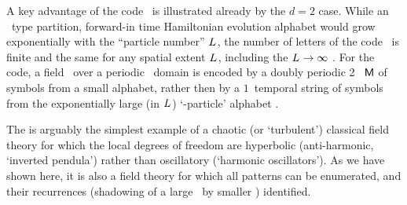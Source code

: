 A key advantage of the {\spt} code \Mm\ is illustrated already by the $d=2$
case. While an \AW\ type partition, forward-in time Hamiltonian evolution
alphabet would grow exponentially with the
``particle number'' ${L_{}}$, the number of letters
 of the {\spt} code \A\ is finite and the same for any
spatial extent
${L_{}}$, including the ${L_{}}\to\infty$ \catlatt. For the
{\spt} code, a field \Xx\ over a periodic \spt\ domain is encoded by a
doubly periodic 2\dmn\ {\brick} $\mathsf{M}$ of symbols from a small alphabet,
rather then by a $1$\dmn\ temporal string of symbols from the
exponentially large (in ${L_{}}$) `\speriod{}-particle' alphabet
\Aa.

The
{\catlatt} is arguably the simplest example of a chaotic (or `turbulent')
classical field theory for which the local degrees of freedom are
hyperbolic (anti-harmonic, `inverted pendula') rather than oscillatory
(`harmonic oscillators'). As we have shown here, it is also a field theory
for which all {\admissible} {\spt} patterns can be enumerated, and their
recurrences (shadowing of a large \twot\ by smaller \twots) identified.
